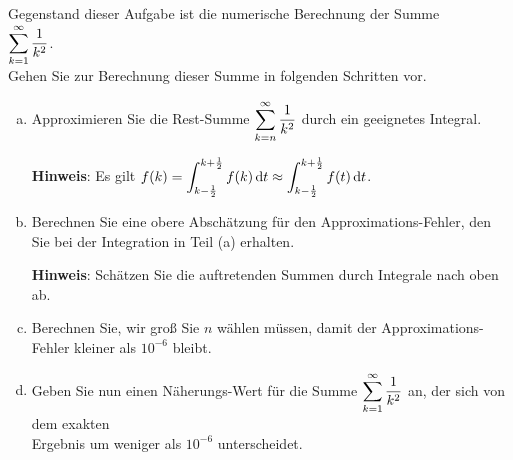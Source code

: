 \exercise
Gegenstand dieser Aufgabe ist die numerische Berechnung der Summe
\\[0.2cm]
\hspace*{1.3cm}
 $\displaystyle \sum\limits_{k=1}^\infty \frac{1}{k^2}$.
\\[0.2cm]
Gehen  Sie zur Berechnung dieser Summe in folgenden Schritten vor.
\begin{enumerate}[(a)]
\item Approximieren Sie die Rest-Summe $\displaystyle\sum\limits_{k=n}^\infty \frac{1}{k^2}$ 
      durch ein geeignetes Integral.

      \textbf{Hinweis}: Es gilt $\displaystyle f(k) = \int_{k-\frac{1}{2}}^{k+\frac{1}{2}} f(k) \, \textrm{d} t \approx \int_{k-\frac{1}{2}}^{k+\frac{1}{2}} f(t) \, \textrm{d} t$.
\item Berechnen Sie eine obere Absch\"atzung f\"ur den Approximations-Fehler,
      den Sie bei der Integration in Teil (a) erhalten.
      
      \textbf{Hinweis}: Sch\"atzen Sie die auftretenden Summen durch Integrale nach oben ab.
\item Berechnen Sie, wir gro{\ss} Sie $n$ w\"ahlen m\"ussen, damit der Approximations-Fehler
      kleiner als $10^{-6}$ bleibt.
\item Geben Sie nun einen N\"aherungs-Wert f\"ur die Summe $\displaystyle\sum\limits_{k=1}^\infty \frac{1}{k^2}$ an,
      der sich von dem exakten \\[-0.2cm]
      Ergebnis um weniger als $10^{-6}$ unterscheidet.
\end{enumerate}



